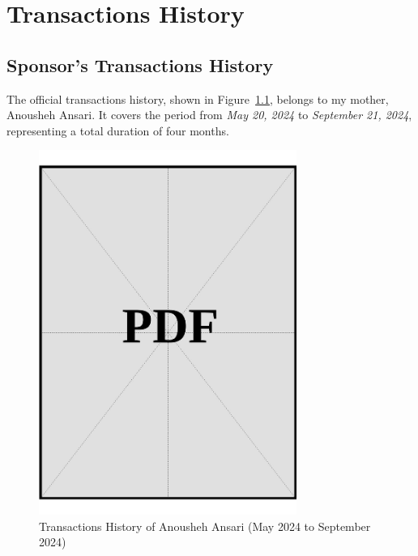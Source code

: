 \chapter{Transactions History}\label{sec:transactions-history}

\section{Sponsor's Transactions History}
\label{sec:sponsor-transactions-history}

\noindent
The official transactions history, shown in Figure~\ref{fig:sponsor-transactions-history}, belongs to my mother, Anousheh Ansari. It covers the period from \textit{May 20, 2024} to \textit{September 21, 2024}, representing a total duration of four months.

\vspace*{\fill}
\begin{figure}[h]
    \centering
    \includegraphics[page=1, width=0.75\textwidth]{../docs/sponsor/funds/bank-account/transaction-history.pdf}
    \caption{Transactions History of Anousheh Ansari (May 2024 to September 2024)}
    \label{fig:sponsor-transactions-history}
\end{figure}
\vspace*{\fill}

